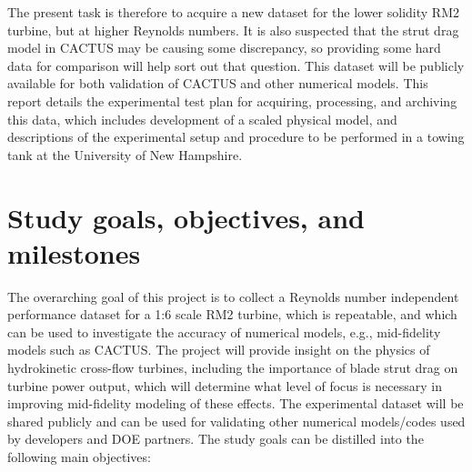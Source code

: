 \documentclass[12pt,letterpaper]{scrreprt}
\begin{document}
The present task is therefore to acquire a new dataset for the lower solidity
RM2 turbine, but at higher Reynolds numbers. It is also suspected that the strut
drag model in CACTUS may be causing some discrepancy, so providing some hard
data for comparison will help sort out that question. This dataset will be
publicly available for both validation of CACTUS and other numerical models.
This report details the experimental test plan for acquiring, processing, and
archiving this data, which includes development of a scaled physical model, and
descriptions of the experimental setup and procedure to be performed in a towing
tank at the University of New Hampshire.


\section{Study goals, objectives, and milestones}

The overarching goal of this project is to collect a Reynolds number independent
performance dataset for a 1:6 scale RM2 turbine, which is repeatable, and which
can be used to investigate the accuracy of numerical models, e.g., mid-fidelity
models such as CACTUS. The project will provide insight on the physics of
hydrokinetic cross-flow turbines, including the importance of blade strut drag
on turbine power output, which will determine what level of focus is necessary
in improving mid-fidelity modeling of these effects. The experimental dataset
will be shared publicly and can be used for validating other numerical
models/codes used by developers and DOE partners. The study goals can be
distilled into the following main objectives:
\end{document}
